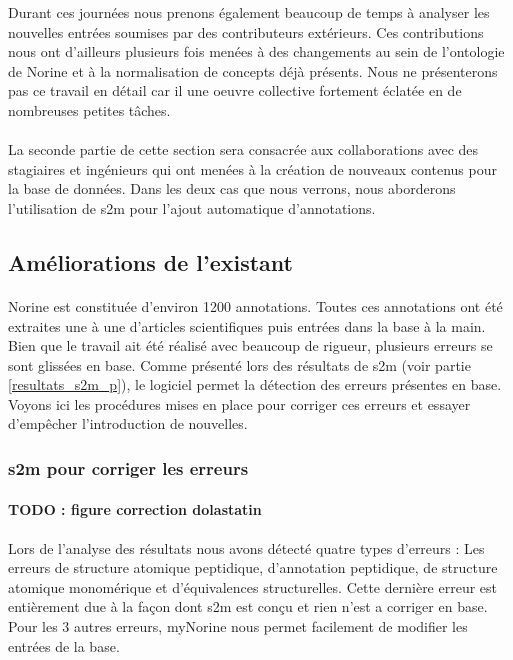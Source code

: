 \documentclass[12pt,french,twoside]{report}
\begin{document}
Durant ces journées nous prenons également beaucoup de temps à analyser les nouvelles entrées soumises par des contributeurs extérieurs.
Ces contributions nous ont d'ailleurs plusieurs fois menées à des changements au sein de l'ontologie de Norine et à la normalisation de concepts déjà présents.
Nous ne présenterons pas ce travail en détail car il une oeuvre collective fortement éclatée en de nombreuses petites tâches.

\paragraph{}La seconde partie de cette section sera consacrée aux collaborations avec des stagiaires et ingénieurs qui ont menées à la création de nouveaux contenus pour la base de données.
Dans les deux cas que nous verrons, nous aborderons l'utilisation de s2m pour l'ajout automatique d'annotations.


\subsection{Améliorations de l'existant}

\paragraph{}Norine est constituée d'environ 1200 annotations.
Toutes ces annotations ont été extraites une à une d'articles scientifiques puis entrées dans la base à la main.
Bien que le travail ait été réalisé avec beaucoup de rigueur, plusieurs erreurs se sont glissées en base.
Comme présenté lors des résultats de s2m (voir partie \ref{resultats_s2m_p}), le logiciel permet la détection des erreurs présentes en base.
Voyons ici les procédures mises en place pour corriger ces erreurs et essayer d'empêcher l'introduction de nouvelles.


\subsubsection{s2m pour corriger les erreurs}

\paragraph{TODO : figure correction dolastatin}

\paragraph{}Lors de l'analyse des résultats nous avons détecté quatre types d'erreurs : Les erreurs de structure atomique peptidique, d'annotation peptidique, de structure atomique monomérique et d'équivalences structurelles.
Cette dernière erreur est entièrement due à la façon dont s2m est conçu et rien n'est a corriger en base.
Pour les 3 autres erreurs, myNorine nous permet facilement de modifier les entrées de la base.
\end{document}
